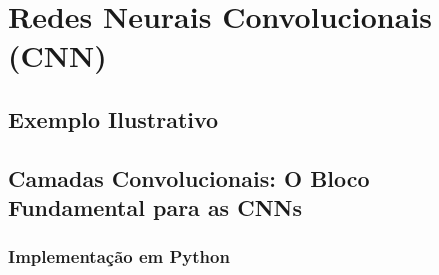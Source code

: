 
\chapter{Redes Neurais Convolucionais (CNN)}
\label{cap:cnn}


\section{Exemplo Ilustrativo}

\section{Camadas Convolucionais: O Bloco Fundamental para as CNNs}

\subsection{Implementação em Python}

